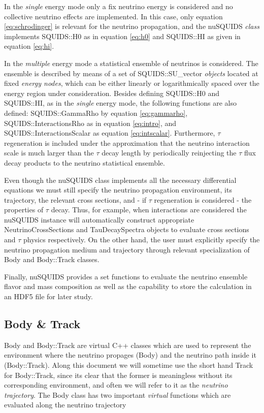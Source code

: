 \documentclass[3p,12pt,authoryear]{elsarticle}
\newcommand{\ttf}{\ttfamily}
\begin{document}
In the {\it single} energy mode only a fix neutrino energy is considered and no collective neutrino effects are implemented. In this case, only equation \eqref{eq:schrodinger} is relevant for the neutrino propagation, and the {\ttf nuSQUIDS} {\it class} implements {\ttf SQUIDS::H0} as in equation \eqref{eq:h0} and {\ttf SQUIDS::HI} as given in equation \eqref{eq:hi}. 

In the {\it multiple} energy mode a statistical ensemble of neutrinos is considered. The ensemble is described by means of a set of {\ttf SQUIDS::SU\_vector} {\it objects} located at fixed {\it energy nodes}, which can be either linearly or logarithmically spaced over the energy region under consideration. Besides defining {\ttf SQUIDS::H0} and {\ttf SQUIDS::HI}, as in the {\it single} energy mode, the following functions are also defined: {\ttf SQUIDS::GammaRho} by equation \eqref{eq:gammarho}, {\ttf SQUIDS::InteractionsRho} as in equation \eqref{eq:intro}, and {\ttf SQUIDS::InteractionsScalar} as equation \eqref{eq:intscalar}. Furthermore, $\tau$ regeneration is included under the approximation that the neutrino interaction scale is much larger than the $\tau$ decay length by periodically reinjecting the $\tau$ flux decay products to the neutrino statistical ensemble.

Even though the {\ttf nuSQUIDS} class implements all the necessary differential equations we must still specify the neutrino propagation environment, its trajectory, the relevant cross sections, and - if $\tau$ regeneration is considered - the properties of $\tau$ decay. Thus, for example, when interactions are considered the {\ttf nuSQUIDS} instance will automatically construct appropriate {\ttf NeutrinoCrossSections} and {\ttf TauDecaySpectra} objects to evaluate cross sections and $\tau$ physics respectively. On the other hand, the user must explicitly specify the neutrino propagation medium and trajectory through relevant specialization of {\ttf Body} and {\ttf Body::Track} classes.

Finally, {\ttf nuSQUIDS} provides a set functions to evaluate the neutrino ensemble flavor and mass composition as well as the capability to store the calculation in an HDF5 \citep{folk1999hdf5} file for later study.


\subsection{Body \& Track}

{\ttf Body} and {\ttf Body::Track} are virtual {\ttf C++} classes which are used to represent the environment where the neutrino propages ({\ttf Body}) and the neutrino path inside it ({\ttf Body::Track}). Along this document we will sometime use the short hand {\ttf Track} for {\ttf Body::Track}, since its clear that the former is meaningless without its corresponding environment, and often we will refer to it as the {\it neutrino trajectory}.  The {\ttf Body} class has two important {\it virtual} functions which are evaluated along the neutrino trajectory
\end{document}

